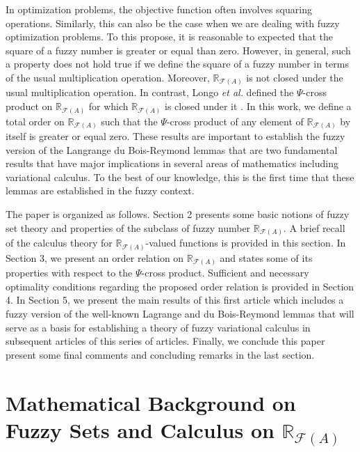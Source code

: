 \documentclass[12pt,a4paper]{article}
\newcommand{\RFA}{\mathbb{R}_{\mathcal{F}(A)}}
\begin{document}
In optimization problems, the objective function often involves squaring operations. 
Similarly, this can also be the case when we are dealing with fuzzy optimization problems. 
To this propose, it is reasonable to expected that the square of a fuzzy number is greater or equal than zero. 
However, in general, such a property does not hold true if we define the square of a fuzzy number in terms of the usual multiplication operation. Moreover, $\RFA$ is not closed under the usual multiplication operation.  
In contrast, Longo {\it et al.} defined the $\Psi$-cross product on $\RFA$ for which $\RFA$ is closed under it \cite{longo2022cross}. 
In this work, we define a total order on $\RFA$ such that the $\Psi$-cross product of any element of $\RFA$ by itself is greater or equal zero.  
These results are important to establish the fuzzy version of the Langrange du Bois-Reymond lemmas that are  two fundamental results that have major implications in several areas of mathematics including variational calculus. 
To the best of our knowledge, this is the first time that these lemmas are established in the fuzzy context. 


The paper is organized as follows. Section 2 presents some basic notions of fuzzy set theory and properties of the subclass of fuzzy number $\RFA$. 
A brief recall of the calculus theory for $\RFA$-valued functions is provided in this section.
In Section 3, we present an order relation on $\RFA$ and states some of its properties with respect to the  $\Psi$-cross product. 
Sufficient and necessary optimality conditions regarding the proposed order relation is provided in  Section 4. In Section 5, we  present the main results of this first article which includes a fuzzy version of the well-known  Lagrange and du Bois-Reymond lemmas that will serve as a basis for establishing a theory of fuzzy variational calculus in subsequent articles of this series of articles.  
Finally, we conclude this paper present some final comments and concluding remarks in the last section.  

\section{Mathematical Background on Fuzzy Sets and Calculus on  $\RFA$}\label{basic}
\end{document}
